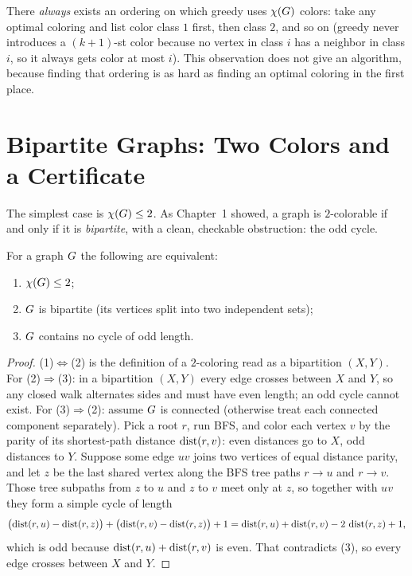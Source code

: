 \begin{trapbox}
There \emph{always} exists an ordering on which greedy uses $\chi(G)$
colors: take any optimal coloring and list color class $1$ first, then class $2$,
and so on (greedy never introduces a $(k+1)$-st color because no vertex in class $i$ has a neighbor in class $i$, so it always gets color at most $i$). This observation does not give an algorithm, because finding that ordering is as hard as finding an optimal coloring in the first place.
\end{trapbox}

\section{Bipartite Graphs: Two Colors and a Certificate}
\label{ch28:bipartite}

The simplest case is $\chi(G)\le 2$. As Chapter~1 showed, a graph is $2$-colorable
if and only if it is \emph{bipartite}, with a clean, checkable obstruction:
the odd cycle.

\begin{theorem}
\label{ch28:thm-bipartite}
For a graph $G$ the following are equivalent:
\begin{enumerate}[label=\textup{(\arabic*)}]
  \item $\chi(G)\le 2$;
  \item $G$ is bipartite (its vertices split into two independent sets);
  \item $G$ contains no cycle of odd length.
\end{enumerate}
\end{theorem}

\begin{proof}
(1)$\Leftrightarrow$(2) is the definition of a $2$-coloring read as a bipartition $(X,Y)$.
For (2)$\Rightarrow$(3): in a bipartition $(X,Y)$ every edge crosses between $X$ and $Y$, so any closed
walk alternates sides and must have even length; an odd cycle cannot exist. For (3)$\Rightarrow$(2): assume $G$ is connected (otherwise treat
each connected component separately). Pick a root $r$, run BFS, and color each vertex $v$ by the parity of its shortest-path
distance $\operatorname{dist}(r,v)$: even distances go to $X$, odd distances to $Y$. Suppose some edge $uv$ joins two
vertices of equal distance parity, and let $z$ be the last shared vertex along the BFS tree paths $r\to u$ and $r\to v$. Those tree subpaths from $z$ to $u$ and $z$ to $v$ meet only at $z$, so together with $uv$ they form a simple cycle of length
\[
  \bigl(\operatorname{dist}(r,u)-\operatorname{dist}(r,z)\bigr) + \bigl(\operatorname{dist}(r,v)-\operatorname{dist}(r,z)\bigr) + 1
  = \operatorname{dist}(r,u) + \operatorname{dist}(r,v) - 2\,\operatorname{dist}(r,z) + 1,
\]
which is odd because $\operatorname{dist}(r,u)+\operatorname{dist}(r,v)$ is even. That contradicts (3), so every edge crosses between $X$ and $Y$.
\end{proof}

